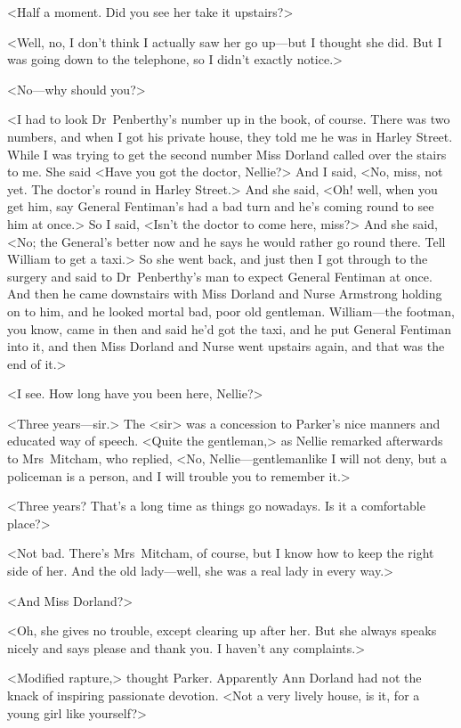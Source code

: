 <Half a moment. Did you see her take it upstairs?>

<Well, no, I don't think I actually saw her go up—but I thought she did. But I was going down to the telephone, so I didn't exactly notice.>

<No—why should you?>

<I had to look Dr~Penberthy's number up in the book, of course. There was two numbers, and when I got his private house, they told me he was in Harley Street. While I was trying to get the second number Miss Dorland called over the stairs to me. She said <Have you got the doctor, Nellie?> And I said, <No, miss, not yet. The doctor's round in Harley Street.> And she said, <Oh! well, when you get him, say General Fentiman's had a bad turn and he's coming round to see him at once.> So I said, <Isn't the doctor to come here, miss?> And she said, <No; the General's better now and he says he would rather go round there. Tell William to get a taxi.> So she went back, and just then I got through to the surgery and said to Dr~Penberthy's man to expect General Fentiman at once. And then he came downstairs with Miss Dorland and Nurse Armstrong holding on to him, and he looked mortal bad, poor old gentleman. William—the footman, you know, came in then and said he'd got the taxi, and he put General Fentiman into it, and then Miss Dorland and Nurse went upstairs again, and that was the end of it.>

<I see. How long have you been here, Nellie?>

<Three years—sir.> The <sir> was a concession to Parker's nice manners and educated way of speech. <Quite the gentleman,> as Nellie remarked afterwards to Mrs~Mitcham, who replied, <No, Nellie—gentlemanlike I will not deny, but a policeman is a person, and I will trouble you to remember it.>

<Three years? That's a long time as things go nowadays. Is it a comfortable place?>

<Not bad. There's Mrs~Mitcham, of course, but I know how to keep the right side of her. And the old lady—well, she was a real lady in every way.>

<And Miss Dorland?>

<Oh, she gives no trouble, except clearing up after her. But she always speaks nicely and says please and thank you. I haven't any complaints.>

<Modified rapture,> thought Parker. Apparently Ann Dorland had not the knack of inspiring passionate devotion. <Not a very lively house, is it, for a young girl like yourself?>

